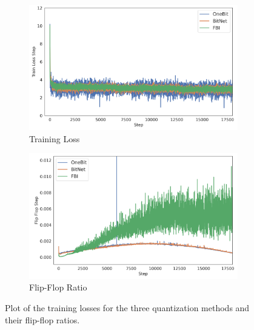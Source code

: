 \documentclass{article}
\begin{document}
\begin{figure}[ht]
  \centering
  \begin{subfigure}[b]{0.45\textwidth}
    \includegraphics[width=\linewidth]{../data/plots/quant_layer.png}
    \caption{Training Loss}
  \end{subfigure}
  \hfill
  \begin{subfigure}[b]{0.45\textwidth}
    \includegraphics[width=\linewidth]{../data/plots/quant_layer_ff.png}
    \caption{Flip-Flop Ratio}
  \end{subfigure}
  \caption{Plot of the training losses for the three quantization methods and their flip-flop ratios.}
  \label{fig:bitlin}
\end{figure}
\end{document}
